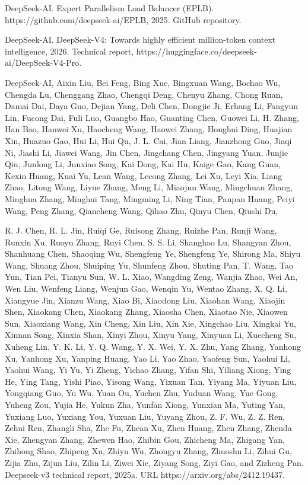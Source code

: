 DeepSeek-AI. Expert Parallelism Load Balancer (EPLB).
https://github.com/deepseek-ai/EPLB, 2025. GitHub repository.

DeepSeek-AI. DeepSeek-V4: Towards highly efficient million-token context
intelligence, 2026. Technical report,
https://huggingface.co/deepseek-ai/DeepSeek-V4-Pro.

DeepSeek-AI, Aixin Liu, Bei Feng, Bing Xue, Bingxuan Wang, Bochao Wu,
Chengda Lu, Chenggang Zhao, Chengqi Deng, Chenyu Zhang, Chong Ruan,
Damai Dai, Daya Guo, Dejian Yang, Deli Chen, Dongjie Ji, Erhang Li,
Fangyun Lin, Fucong Dai, Fuli Luo, Guangbo Hao, Guanting Chen, Guowei
Li, H. Zhang, Han Bao, Hanwei Xu, Haocheng Wang, Haowei Zhang, Honghui
Ding, Huajian Xin, Huazuo Gao, Hui Li, Hui Qu, J. L. Cai, Jian Liang,
Jianzhong Guo, Jiaqi Ni, Jiashi Li, Jiawei Wang, Jin Chen, Jingchang
Chen, Jingyang Yuan, Junjie Qiu, Junlong Li, Junxiao Song, Kai Dong, Kai
Hu, Kaige Gao, Kang Guan, Kexin Huang, Kuai Yu, Lean Wang, Lecong Zhang,
Lei Xu, Leyi Xia, Liang Zhao, Litong Wang, Liyue Zhang, Meng Li, Miaojun
Wang, Mingchuan Zhang, Minghua Zhang, Minghui Tang, Mingming Li, Ning
Tian, Panpan Huang, Peiyi Wang, Peng Zhang, Qiancheng Wang, Qihao Zhu,
Qinyu Chen, Qiushi Du,



R. J. Chen, R. L. Jin, Ruiqi Ge, Ruisong Zhang, Ruizhe Pan, Runji Wang,
Runxin Xu, Ruoyu Zhang, Ruyi Chen, S. S. Li, Shanghao Lu, Shangyan Zhou,
Shanhuang Chen, Shaoqing Wu, Shengfeng Ye, Shengfeng Ye, Shirong Ma,
Shiyu Wang, Shuang Zhou, Shuiping Yu, Shunfeng Zhou, Shuting Pan, T.
Wang, Tao Yun, Tian Pei, Tianyu Sun, W. L. Xiao, Wangding Zeng, Wanjia
Zhao, Wei An, Wen Liu, Wenfeng Liang, Wenjun Gao, Wenqin Yu, Wentao
Zhang, X. Q. Li, Xiangyue Jin, Xianzu Wang, Xiao Bi, Xiaodong Liu,
Xiaohan Wang, Xiaojin Shen, Xiaokang Chen, Xiaokang Zhang, Xiaosha Chen,
Xiaotao Nie, Xiaowen Sun, Xiaoxiang Wang, Xin Cheng, Xin Liu, Xin Xie,
Xingchao Liu, Xingkai Yu, Xinnan Song, Xinxia Shan, Xinyi Zhou, Xinyu
Yang, Xinyuan Li, Xuecheng Su, Xuheng Lin, Y. K. Li, Y. Q. Wang, Y. X.
Wei, Y. X. Zhu, Yang Zhang, Yanhong Xu, Yanhong Xu, Yanping Huang, Yao
Li, Yao Zhao, Yaofeng Sun, Yaohui Li, Yaohui Wang, Yi Yu, Yi Zheng,
Yichao Zhang, Yifan Shi, Yiliang Xiong, Ying He, Ying Tang, Yishi Piao,
Yisong Wang, Yixuan Tan, Yiyang Ma, Yiyuan Liu, Yongqiang Guo, Yu Wu,
Yuan Ou, Yuchen Zhu, Yuduan Wang, Yue Gong, Yuheng Zou, Yujia He, Yukun
Zha, Yunfan Xiong, Yunxian Ma, Yuting Yan, Yuxiang Luo, Yuxiang You,
Yuxuan Liu, Yuyang Zhou, Z. F. Wu, Z. Z. Ren, Zehui Ren, Zhangli Sha,
Zhe Fu, Zhean Xu, Zhen Huang, Zhen Zhang, Zhenda Xie, Zhengyan Zhang,
Zhewen Hao, Zhibin Gou, Zhicheng Ma, Zhigang Yan, Zhihong Shao, Zhipeng
Xu, Zhiyu Wu, Zhongyu Zhang, Zhuoshu Li, Zihui Gu, Zijia Zhu, Zijun Liu,
Zilin Li, Ziwei Xie, Ziyang Song, Ziyi Gao, and Zizheng Pan. Deepseek-v3
technical report, 2025a. URL https://arxiv.org/abs/2412.19437.


